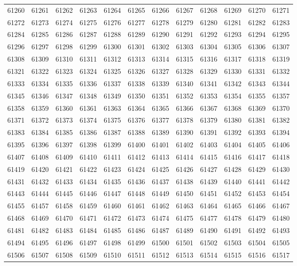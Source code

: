 \begin{center}
\begin{longtable}{llllllllllll}
61260 &61261 &61262 &61263 &61264 &61265 &61266 &61267 &61268 &61269 &61270 &61271 \\
61272 &61273 &61274 &61275 &61276 &61277 &61278 &61279 &61280 &61281 &61282 &61283 \\
61284 &61285 &61286 &61287 &61288 &61289 &61290 &61291 &61292 &61293 &61294 &61295 \\
61296 &61297 &61298 &61299 &61300 &61301 &61302 &61303 &61304 &61305 &61306 &61307 \\
61308 &61309 &61310 &61311 &61312 &61313 &61314 &61315 &61316 &61317 &61318 &61319 \\
61321 &61322 &61323 &61324 &61325 &61326 &61327 &61328 &61329 &61330 &61331 &61332 \\
61333 &61334 &61335 &61336 &61337 &61338 &61339 &61340 &61341 &61342 &61343 &61344 \\
61345 &61346 &61347 &61348 &61349 &61350 &61351 &61352 &61353 &61354 &61355 &61357 \\
61358 &61359 &61360 &61361 &61363 &61364 &61365 &61366 &61367 &61368 &61369 &61370 \\
61371 &61372 &61373 &61374 &61375 &61376 &61377 &61378 &61379 &61380 &61381 &61382 \\
61383 &61384 &61385 &61386 &61387 &61388 &61389 &61390 &61391 &61392 &61393 &61394 \\
61395 &61396 &61397 &61398 &61399 &61400 &61401 &61402 &61403 &61404 &61405 &61406 \\
61407 &61408 &61409 &61410 &61411 &61412 &61413 &61414 &61415 &61416 &61417 &61418 \\
61419 &61420 &61421 &61422 &61423 &61424 &61425 &61426 &61427 &61428 &61429 &61430 \\
61431 &61432 &61433 &61434 &61435 &61436 &61437 &61438 &61439 &61440 &61441 &61442 \\
61443 &61444 &61445 &61446 &61447 &61448 &61449 &61450 &61451 &61452 &61453 &61454 \\
61455 &61457 &61458 &61459 &61460 &61461 &61462 &61463 &61464 &61465 &61466 &61467 \\
61468 &61469 &61470 &61471 &61472 &61473 &61474 &61475 &61477 &61478 &61479 &61480 \\
61481 &61482 &61483 &61484 &61485 &61486 &61487 &61489 &61490 &61491 &61492 &61493 \\
61494 &61495 &61496 &61497 &61498 &61499 &61500 &61501 &61502 &61503 &61504 &61505 \\
61506 &61507 &61508 &61509 &61510 &61511 &61512 &61513 &61514 &61515 &61516 &61517 \\

\end{longtable}
\end{center}
